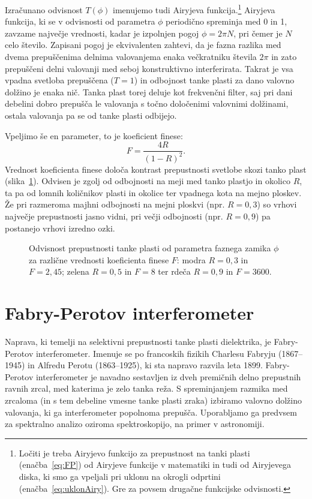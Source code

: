 Izračunano odvisnost $T(\phi)$ imenujemo tudi Airyjeva
funkcija.\footnote{Ločiti je treba Airyjevo funkcijo za prepustnost 
na tanki plasti (enačba~\ref{eq:FP}) od Airyjeve funkcije v matematiki in tudi 
od Airyjevega diska, ki smo ga vpeljali pri uklonu na okrogli odprtini 
(enačba~\ref{eq:uklonAiry}). Gre za povsem drugačne funkcijske odvisnosti.}
Airyjeva funkcija, ki se v odvisnosti od parametra $\phi$ periodično spreminja
med 0 in 1, zavzame največje vrednosti, kadar je izpolnjen pogoj $\phi = 2 \pi N$, 
pri čemer je $N$ celo število. Zapisani pogoj je ekvivalenten zahtevi, da je  
fazna razlika med dvema prepuščenima delnima valovanjema enaka večkratniku 
števila $2\pi$ in zato prepuščeni delni valovanji med seboj konstruktivno 
interferirata. Takrat je vsa vpadna svetloba prepuščena ($T=1$) in 
odbojnost tanke plasti za dano valovno dolžino je enaka nič. Tanka plast torej 
deluje kot frekvenčni filter, saj pri dani debelini dobro prepušča le valovanja
s točno določenimi valovnimi dolžinami, ostala valovanja pa se od tanke plasti 
odbijejo.

Vpeljimo še en parameter, to je koeficient finese:
\begin{equation}
F = \frac{4R}{(1-R)^2}.
\label{eq:06_44d}
\end{equation}
Vrednost koeficienta finese določa kontrast prepustnosti svetlobe skozi tanko
plast (slika~\ref{fig:06_FP1}). Odvisen je zgolj od odbojnosti na meji
med tanko plastjo in okolico $R$, ta pa od lomnih količnikov plasti in okolice
ter vpadnega kota na mejno ploskev. Že pri razmeroma majhni odbojnosti na mejni
ploskvi (npr. $R=0,3$) so vrhovi največje prepustnosti jasno vidni, pri večji 
odbojnosti (npr. $R=0,9$) pa postanejo vrhovi izredno ozki.
\begin{figure}[ht]
\centering
\def\svgwidth{110truemm} 

\caption{Odvisnost prepustnosti tanke plasti od parametra faznega zamika $\phi$
za različne vrednosti koeficienta finese $F$: modra $R = 0,3$ in $F=2,45$; 
zelena $R=0,5$ in $F=8$ ter rdeča $R=0,9$ in $F=3600$.}
\label{fig:06_FP1}
\end{figure}

\section{Fabry-Perotov interferometer}
Naprava, ki temelji na selektivni prepustnosti tanke plasti dielektrika, je 
Fabry-Perotov interferometer. Imenuje se po francoskih fizikih Charlesu Fabryju (1867--1945)
in Alfredu Perotu (1863--1925), ki sta napravo razvila leta 1899. Fabry-Perotov interferometer
je navadno sestavljen iz dveh premičnih delno prepustnih ravnih zrcal, med katerima
je zelo tanka reža. S spreminjanjem razmika med zrcaloma (in s tem debeline vmesne tanke
plasti zraka) izbiramo valovno dolžino
valovanja, ki ga interferometer popolnoma prepušča. Uporabljamo ga predvsem
za spektralno analizo oziroma spektroskopijo, na primer v astronomiji. 

